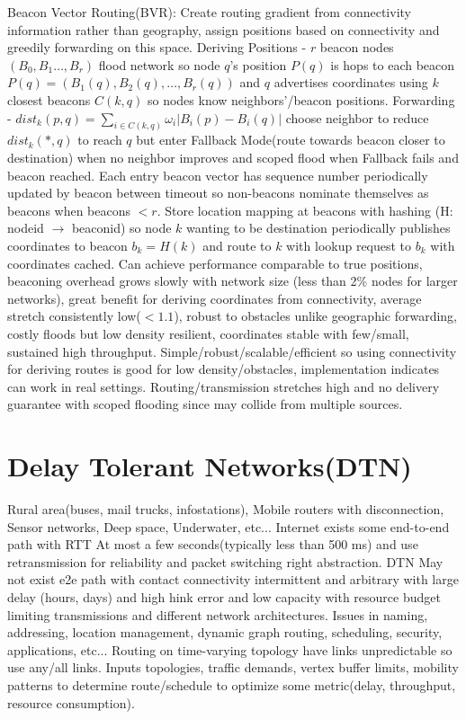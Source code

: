\documentclass[8pt]{extarticle}
\begin{document}
\begin{multicols}{2}
Beacon Vector Routing(BVR): Create routing gradient from connectivity information rather than geography, assign positions based on connectivity and greedily forwarding on this space. Deriving Positions - $r$ beacon nodes $(B_0,B_1\dots{,B_r})$ flood network so node $q$’s position $P(q)$ is hops to each beacon $P(q) = (B_1(q), B_2(q),\dots{,B_r(q)})$ and $q$ advertises coordinates using $k$ closest beacons $C(k,q)$ so nodes know neighbors’/beacon positions. Forwarding - $dist_k(p,q)=\sum_{i\in{C(k,q)}}\omega_i{|B_i(p)-B_i(q)|}$ choose neighbor to reduce $dist_k(*,q)$ to reach $q$ but enter Fallback Mode(route towards beacon closer to destination) when no neighbor improves and scoped flood when Fallback fails and beacon reached. Each entry beacon vector has sequence number periodically updated by beacon between timeout so non-beacons nominate themselves as beacons when beacons $<r$. Store location mapping at beacons with hashing (H: nodeid $\rightarrow$ beaconid) so node $k$ wanting to be destination periodically publishes coordinates to beacon $b_k=H(k)$ and route to $k$ with lookup request to $b_k$ with coordinates cached. Can achieve performance comparable to true positions, beaconing overhead grows slowly with network size (less than 2\% nodes for larger networks), great benefit for deriving coordinates from connectivity, average stretch consistently low($<1.1$), robust to obstacles unlike geographic forwarding, costly floods but low density resilient, coordinates stable with few/small, sustained high throughput. Simple/robust/scalable/efficient so using connectivity for deriving routes is good for low density/obstacles, implementation indicates can work in real settings. Routing/transmission stretches high and no delivery guarantee with scoped flooding since may collide from multiple sources.

\section{Delay Tolerant Networks(DTN)}

Rural area(buses, mail trucks, infostations), Mobile routers with disconnection, Sensor networks, Deep space, Underwater, etc... Internet exists some end-to-end path with RTT At most a few seconds(typically less than 500 ms) and use retransmission for reliability and packet switching right abstraction. DTN May not exist e2e path with contact connectivity intermittent and arbitrary with large delay (hours, days) and high hink error and low capacity with resource budget limiting transmissions and different network architectures. Issues in naming, addressing, location management, dynamic graph routing, scheduling, security, applications, etc... Routing on time-varying topology have links unpredictable so use any/all links. Inputs topologies, traffic demands, vertex buffer limits, mobility patterns to determine route/schedule to optimize some metric(delay, throughput, resource consumption).


\end{multicols}
\end{document}
